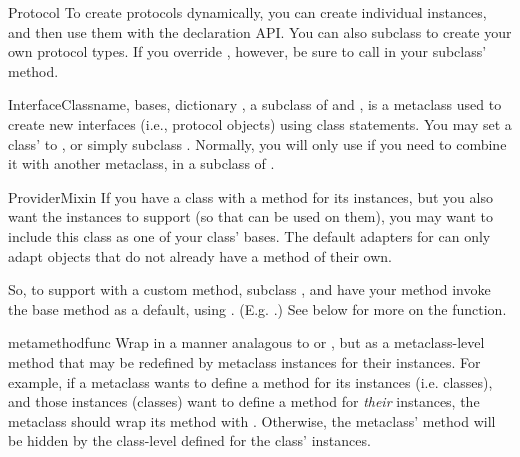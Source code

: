 \begin{verbatim%
}
\begin{verbatim%
}
\begin{verbatim%
}
\begin{verbatim%
}
\begin{verbatim%
}
\begin{verbatim%
}
\begin{classdesc*}{Protocol}
To create protocols dynamically, you can create individual 
instances, and then use them with the declaration API.  You can also subclass
 to create your own protocol types.  If you override
, however, be sure to call 
in your subclass'  method.
\end{classdesc*}


\begin{classdesc}{InterfaceClass}{name, bases, dictionary}
, a subclass of  and , is a
metaclass used to create new interfaces (i.e., protocol objects) using class
statements.  You may set a class'  to
, or simply subclass .  Normally, you
will only use  if you need to combine it with another
metaclass, in a subclass of .
\end{classdesc}







\begin{classdesc*}{ProviderMixin}
If you have a class with a  method for its instances, but
you also want the instances to support  (so that
 can be used on them), you may want to include this
class as one of your class' bases.  The default adapters for
 can only adapt objects that do not already have a
 method of their own.

So, to support  with a custom 
method, subclass , and have your 
method invoke the base  method as a default, using
.  (E.g. .)  See below for more on
the  function.
\end{classdesc*}


\begin{funcdesc}{metamethod}{func}
Wrap  in a manner analagous to  or
, but as a metaclass-level method that may be redefined
by metaclass instances for their instances.  For example, if a metaclass wants
to define a  method for its instances (i.e. classes), and
those instances (classes) want to define a  method for
\emph{their} instances, the metaclass should wrap its 
method with .  Otherwise, the metaclass'
 method will be hidden by the class-level
 defined for the class' instances.
\end{funcdesc}


\end{verbatim%
}
\end{verbatim%
}
\end{verbatim%
}
\end{verbatim%
}
\end{verbatim%
}
\end{verbatim%
}
